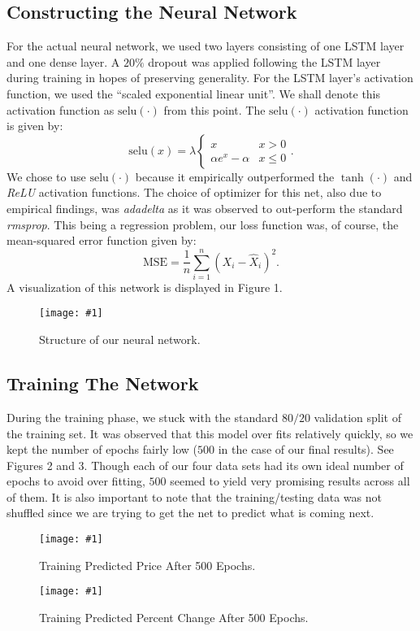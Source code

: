 \documentclass[conference]{IEEEtran}
\newcommand{\genFig}[2]
{
     \begin{figure}
        \centering
        \texttt{[image: \#1]}
        \caption{#2}
    \end{figure}
}
\newcommand{\selu}
{
	\text{selu}
}
\begin{document}
\subsection{Constructing the Neural Network}
For the actual neural network, we used two layers consisting of one LSTM layer and one dense
layer. A $20\%$ dropout was applied following the LSTM layer \cite{b2} during training in
hopes of preserving generality. For the LSTM layer's activation function, we used the
``scaled exponential linear unit''\cite{b14}. We shall denote this activation function as
$\selu(\cdot)$ from this point. The $\selu(\cdot)$ activation function is given by:
\begin{equation*}
\text{selu}(x) = \lambda
  \begin{cases} 
      x                     & x > 0  \\
      \alpha e^{x} - \alpha & x \leq 0
  \end{cases}.
\end{equation*}
We chose to use $\selu(\cdot)$ because it empirically outperformed the $\tanh(\cdot)$ and
\textit{ReLU} activation functions.  The choice of optimizer for this net, also due to
empirical findings, was \textit{adadelta}\cite{b18}\cite{b19} as it was observed to
out-perform the standard \textit{rmsprop}. This being a  regression problem, our loss
function was, of course, the mean-squared error function given by:
\begin{equation*}
\text{MSE} = \frac{1}{n}\sum_{i = 1}^{n}(X_i - \hat{X}_i)^2.
\end{equation*}
A visualization of this network is displayed in Figure 1.
\genFig{LSTM.png}{Structure of our neural network.}

\subsection{Training The Network}
During the training phase, we stuck with the standard $80/20$ validation split of the training
set. It was observed that this model over fits relatively quickly, so we kept the number of
epochs fairly low ($500$ in the case of our final results). See Figures 2 and 3. Though each
of our four data sets had its own ideal number of epochs to avoid over fitting, $500$ seemed to
yield very promising results across all of them. It is also important to note that the
training/testing data was not shuffled since we are trying to get the net to predict what is
coming next.
\genFig{training.png}{Training Predicted Price After 500 Epochs.}
\genFig{training_percent.png}{Training Predicted Percent Change After 500 Epochs.}
\end{document}
